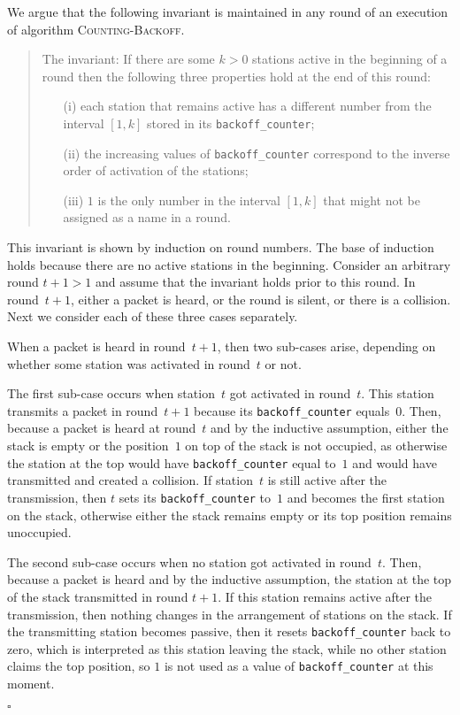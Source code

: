 \documentclass[11pt]{article}
\newcommand{\qed}{\hfill $\square$ \smallbreak}
\newenvironment{proof}{\noindent{\bf Proof:}}{\qed}
\begin{document}
\begin{proof} 
We argue that the following invariant is maintained in any round of an execution of algorithm \textsc{Counting-Backoff}.
\begin{quote}
\textsf{The invariant:}
If there are some $k>0$ stations active in the beginning of a round then the following three properties hold at the end of this round:
\begin{enumerate}
\item[(i)] 
each station that remains active has a different number from the interval $[1,k]$ stored in its \texttt{backoff\_counter};

\item[(ii)]
the increasing values of  \texttt{backoff\_counter} correspond to the inverse order of  activation of the stations;

\item[(iii)] 
$1$ is the only number in the interval $[1,k]$ that might not be assigned as a name in a round.
\end{enumerate}
\end{quote}
This invariant is shown by induction  on  round numbers.
The base of induction holds because there are no active stations in the beginning.
Consider an arbitrary round $t+1>1$ and assume that the invariant holds prior to this round.
In round~$t+1$,  either a packet is heard, or the round is silent, or there is a collision. 
Next we consider each of these three cases separately. 

When a packet is heard in round~$t+1$, then two sub-cases arise, depending on whether some station was activated in round~$t$ or not.

The first sub-case occurs when station~$t$ got activated in round~$t$.
This station transmits a packet in round~$t+1$ because its \texttt{backoff\_counter} equals~$0$.
Then, because a packet is heard at round~$t$ and by the inductive assumption, either the stack is empty or the position~$1$ on top of the stack is not occupied, as otherwise the station at the top  would have \texttt{backoff\_counter} equal to~$1$ and would have transmitted and created a collision.
If station~$t$ is still active after the transmission, then $t$ sets its \texttt{backoff\_counter} to~$1$ and becomes the first station on the stack, otherwise either the stack remains empty or its top position remains unoccupied.

The second sub-case occurs when no station got activated in round~$t$.
Then, because a packet is heard and by the inductive assumption, the station at the top of the stack transmitted in round $t+1$.
If this station remains active after the transmission, then nothing changes in the arrangement of stations on the stack.
If the transmitting station becomes passive, then it resets \texttt{backoff\_counter} back to zero, which is interpreted as this station leaving the stack, while no other station claims the top position,  so $1$ is not used as a value of \texttt{backoff\_counter} at this moment.


\end{proof}
\end{document}
